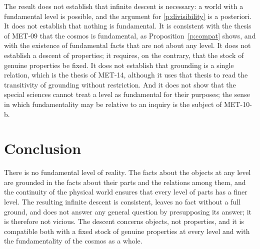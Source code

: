 \documentclass{situationist-preprint}
\begin{document}
The result does not establish that infinite descent is necessary: a world with a fundamental level is possible, and the argument for \ref{p:divisibility} is a posteriori. It does not establish that nothing is fundamental. It is consistent with the thesis of MET-09 that the cosmos is fundamental, as Proposition~\ref{p:compat} shows, and with the existence of fundamental facts that are not about any level. It does not establish a descent of properties; it requires, on the contrary, that the stock of genuine properties be fixed. It does not establish that grounding is a single relation, which is the thesis of MET-14, although it uses that thesis to read the transitivity of grounding without restriction. And it does not show that the special sciences cannot treat a level as fundamental for their purposes; the sense in which fundamentality may be relative to an inquiry is the subject of MET-10-b.

\section{Conclusion}

There is no fundamental level of reality. The facts about the objects at any level are grounded in the facts about their parts and the relations among them, and the continuity of the physical world ensures that every level of parts has a finer level. The resulting infinite descent is consistent, leaves no fact without a full ground, and does not answer any general question by presupposing its answer; it is therefore not vicious. The descent concerns objects, not properties, and it is compatible both with a fixed stock of genuine properties at every level and with the fundamentality of the cosmos as a whole.
\end{document}
